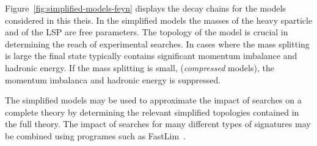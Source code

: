 Figure~\ref{fig:simplified-models-feyn} displays the decay chains for the models considered in this theis. 
In the simplified models the masses of the heavy sparticle and of the LSP are free parameters.
The topology of the model is crucial in determining the reach of experimental searches. 
In cases where the mass splitting is large the final state typically contains significant
momentum imbalance and hadronic energy. If the mass splitting is small, (\emph{compressed} models),
the momentum imbalanca and hadronic energy is suppressed.

The simplified models may be used to approximate the impact of searches on a complete theory 
by determining the relevant simplified topologies contained in the full theory. The impact
of searches for many different types of signatures may be combined using programes 
such as FastLim~\cite{Fastlim}.





